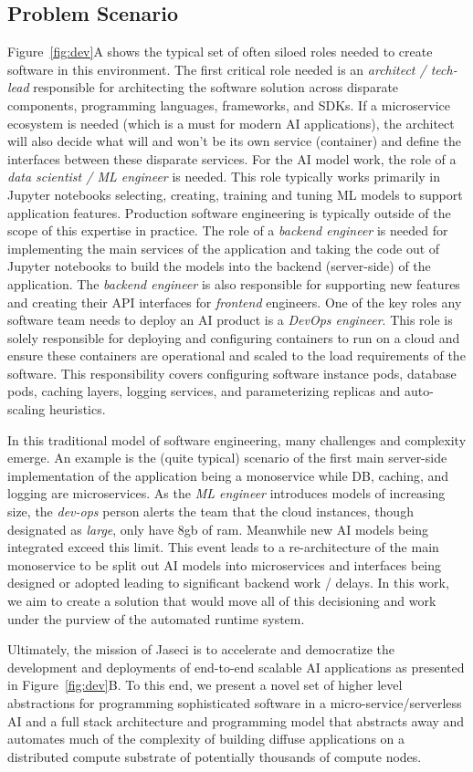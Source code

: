 \subsection{Problem Scenario}
Figure~\ref{fig:dev}A shows the typical set of  often siloed roles needed to create software in this environment.
The first critical role needed is an \emph{architect / tech-lead} responsible for architecting the software solution across disparate components, programming languages, frameworks, and SDKs.
If a microservice ecosystem is needed (which is a must for modern
AI applications), the architect will also decide what will and won't be its own service (container) and define the interfaces between these disparate  services.
For the AI model work, the role of a \emph{data scientist / ML engineer} is needed.
This role typically works primarily in Jupyter notebooks selecting, creating, training and tuning ML models to support application features.
Production software engineering is typically outside of the scope of this expertise in practice.
The role of a \emph{backend engineer} is needed for implementing the main services of the application and taking the code out of Jupyter notebooks to build the models into the backend (server-side) of the application.
The \emph{backend engineer} is also responsible for supporting new features and creating their API interfaces for \emph{frontend} engineers.
One of the key roles any software team needs to deploy an AI product is a \emph{DevOps engineer}.
This role is solely responsible for deploying and configuring containers to run on a cloud and ensure these containers are operational and scaled to the load requirements of the software.
This responsibility covers configuring software instance pods, database pods, caching layers, logging services, and parameterizing replicas and auto-scaling heuristics.



In this traditional model of software engineering, many challenges and complexity emerge.
An example is the (quite typical) scenario of the first main server-side implementation of the application being a monoservice while DB, caching, and logging are microservices.
As the \emph{ML engineer} introduces models of increasing size, the \emph{dev-ops} person alerts the team that the cloud instances, though designated as \emph{large}, only have 8gb of ram.
Meanwhile new AI models being integrated exceed this limit.
This event leads to a re-architecture of the main monoservice to be split out AI models into microservices and interfaces being designed or adopted leading to significant backend work / delays.
In this work, we aim to create a solution that would move all of this decisioning and work under the purview of the automated runtime system.

Ultimately, the mission of Jaseci is to accelerate and democratize the development and deployments of end-to-end scalable AI applications as presented in Figure~\ref{fig:dev}B.
To this end, we present a novel set of higher level abstractions for programming sophisticated software in a micro-service/serverless AI and a full stack architecture and programming model that abstracts away and automates much of the complexity of building diffuse applications on a distributed compute substrate of potentially thousands of compute nodes.